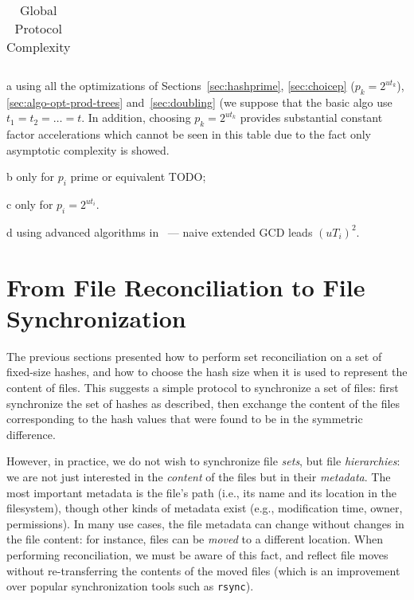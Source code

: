 \documentclass[11pt]{llncs}
\newcommand{\rsync}{\texttt{rsync}\xspace}
\begin{document}
\begin{table}[ht]
\begin{threeparttable}
\begin{tabularx}{\textwidth}{lXC{2cm}C{2cm}p{4.2cm}}
\bottomrule
  \end{tabularx}
  \begin{tablenotes}
    \item[a] using all the optimizations of Sections~\ref{sec:hashprime}, \ref{sec:choicep} ($p_k = 2^{ut_k}$), \ref{sec:algo-opt-prod-trees} and~\ref{sec:doubling} (we suppose that the basic algo use $t_1=t_2=\dots=t$. In addition, choosing $p_k = 2^{ut_k}$ provides substantial constant factor accelerations which cannot be seen in this table due to the fact only asymptotic complexity is showed.
    \item[b] only for $p_i$ prime or equivalent TODO;
    \item[c] only for $p_i = 2^{ut_i}$.
    \item[d] using advanced algorithms in~\cite{pan2004rational,wang2003acceleration} --- naive extended GCD leads $(uT_i)^2$.
  \end{tablenotes}
 \end{threeparttable}
  \caption{Global Protocol Complexity}
  \label{tab:workload}
\end{table}

\section{From File Reconciliation to File Synchronization}
\label{files}

The previous sections presented how to perform set reconciliation on a set of
fixed-size hashes, and how to choose the hash size when it is used to represent
the content of files. This suggests a simple protocol to synchronize a set of
files: first synchronize the set of hashes as described, then exchange the
content of the files corresponding to the hash values that were found to be in
the symmetric difference.

However, in practice, we do not wish to synchronize file \emph{sets}, but file
\emph{hierarchies}: we are not just interested in the \emph{content} of the
files but in their \emph{metadata}. The most important metadata is the file's
path (i.e., its name and its location in the filesystem), though other kinds of
metadata exist (e.g., modification time, owner, permissions). In many use
cases, the file metadata can change without changes in the file content: for
instance, files can be \emph{moved} to a different location. When performing
reconciliation, we must be aware of this fact, and reflect file moves without
re-transferring the contents of the moved files (which is an improvement over
popular synchronization tools such as \rsync).
\end{document}
